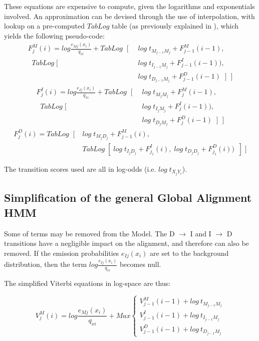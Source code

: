 These equations are expensive to compute, given the logarithms and exponentials involved. An approximation can be devised through the use of interpolation, with lookup on a pre-computed $TabLog$ table (as previously explained in ), which yields the following pseudo-code:
\begin{align*}
 F^M_j(i) = log \frac{e_{Mj}(x_i) }{q_{xi}} + TabLog \;\;  
		[\;\; &log \; t_{M_{j-1} M_j} + F^M_{j-1}(i-1), \\
		 \;\;  TabLog \; [ \; &log \; t_{I_{j-1} M_j} + F^I_{j-1}(i-1)), \\
		 \;\;	&log \; t_{D_{j-1} M_j} + F^D_{j-1}(i-1) \;\; ] \;\; ]
\end{align*}
\begin{align*}
 F^I_j(i) = log \frac{e_{Ij}(x_i) }{q_{xi}} + TabLog \;\;  
		[\;\; &log \; t_{M_{j} M_j} + F^M_{j}(i-1), \\
		 \;\;  TabLog \; [ \; &log \; t_{I_{j} M_j} + F^I_{j}(i-1)), \\
		 \;\;	&log \; t_{D_{j} M_j} + F^D_{j}(i-1) \;\; ] \;\; ]
\end{align*}
\begin{align*}
F^D_j(i) = TabLog \;\; [ \; &log \; t_{M_{j} D_j} + F^M_{j-1}(i), \;\; \\
		&TabLog \; [	\; log \; t_{I_{j} D_j} + F^I_{j_1}(i),  
				\; log \; t_{D_{j} D_j} + F^D_{j_1}(i) ) \;\; ] \; ]
\end{align*}

The transition scores used are all in log-odds (i.e. $log \; t_{X_j Y_i }$).



\subsection{Simplification of the general Global Alignment HMM}

Some of terms may be removed from the Model. The D $\rightarrow$ I and I $\rightarrow$ D transitions have a negligible impact on the alignment, and therefore can also be removed. If the emission probabilities $e_{Ij}(x_i)$ are set to the background distribution, then the term $log \frac{e_{Ij}(x_i) }{q_{xi}}$ becomes null.

The simplified Viterbi equations in log-space are thus:

$$ V^M_j(i) = log \frac{e_{Mj}(x_i) }{q_{xi}} + Max  
		\begin{cases}
			V^M_{j-1} (i-1) + log\ t_{M_{j-1} M_j}  \\
			V^I_ {j-1} (i-1) + log\ t_{I_{j-1} M_j}  \\
			V^D_{j-1} (i-1) + log\ t_{D_{j-1} M_j} 
		\end{cases} $$

